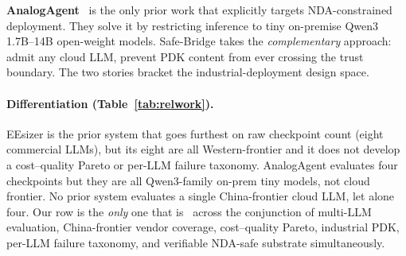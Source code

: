 \textbf{AnalogAgent}~\cite{analogagent} is the only prior work that
explicitly targets NDA-constrained deployment. They solve it by
restricting inference to tiny on-premise Qwen3 1.7B--14B open-weight
models. Safe-Bridge takes the \emph{complementary} approach: admit
any cloud LLM, prevent PDK content from ever crossing the trust
boundary. The two stories bracket the industrial-deployment design
space.

\paragraph{Differentiation (Table~\ref{tab:relwork}).}
EEsizer is the prior system that goes furthest on raw checkpoint
count (eight commercial LLMs), but its eight are all
Western-frontier and it does not develop a cost--quality Pareto or
per-LLM failure taxonomy. AnalogAgent evaluates four checkpoints
but they are all Qwen3-family on-prem tiny models, not cloud
frontier. No prior system evaluates a single China-frontier cloud
LLM, let alone four. Our row is the \emph{only} one that is \yes\
across the conjunction of multi-LLM evaluation, China-frontier
vendor coverage, cost--quality Pareto, industrial PDK, per-LLM
failure taxonomy, and verifiable NDA-safe substrate simultaneously.

